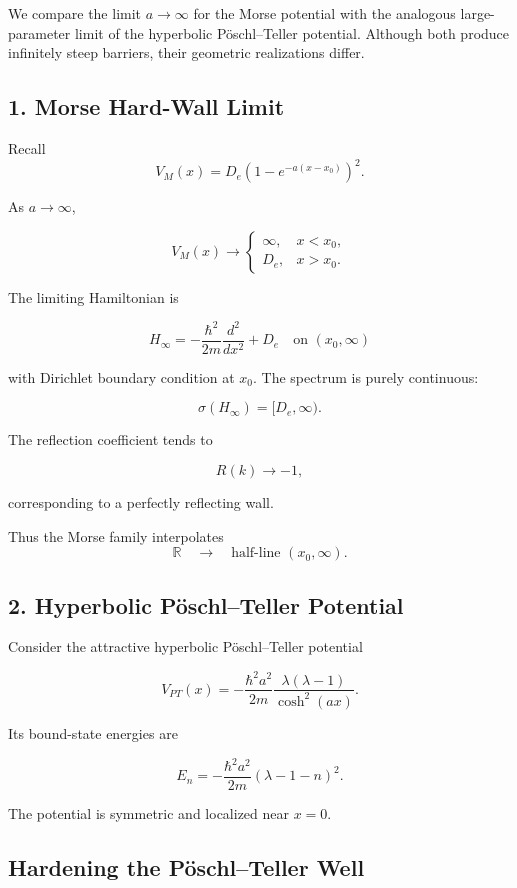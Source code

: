 \documentclass[11pt]{article}
\begin{document}
We compare the limit $a\to\infty$ for the Morse potential
with the analogous large-parameter limit of the
hyperbolic P\"oschl--Teller potential.
Although both produce infinitely steep barriers,
their geometric realizations differ.

\subsection{1. Morse Hard-Wall Limit}

Recall
\[
V_M(x)=D_e\left(1-e^{-a(x-x_0)}\right)^2.
\]

As $a\to\infty$,

\[
V_M(x)\to
\begin{cases}
\infty, & x<x_0,\\[6pt]
D_e, & x>x_0.
\end{cases}
\]

The limiting Hamiltonian is

\[
H_\infty
=
-\frac{\hbar^2}{2m}\frac{d^2}{dx^2}
+D_e
\quad \text{on } (x_0,\infty)
\]

with Dirichlet boundary condition at $x_0$.
The spectrum is purely continuous:

\[
\sigma(H_\infty)=[D_e,\infty).
\]

The reflection coefficient tends to

\[
R(k)\to -1,
\]

corresponding to a perfectly reflecting wall.

\medskip

Thus the Morse family interpolates
\[
\mathbb R
\quad\longrightarrow\quad
\text{half-line }(x_0,\infty).
\]

\subsection{2. Hyperbolic P\"oschl--Teller Potential}

Consider the attractive hyperbolic P\"oschl--Teller potential

\[
V_{PT}(x)
=
-\frac{\hbar^2 a^2}{2m}
\frac{\lambda(\lambda-1)}{\cosh^2(ax)}.
\]

Its bound-state energies are

\[
E_n
=
-\frac{\hbar^2 a^2}{2m}
(\lambda-1-n)^2.
\]

The potential is symmetric and localized near $x=0$.

\subsection{Hardening the P\"oschl--Teller Well}
\end{document}
